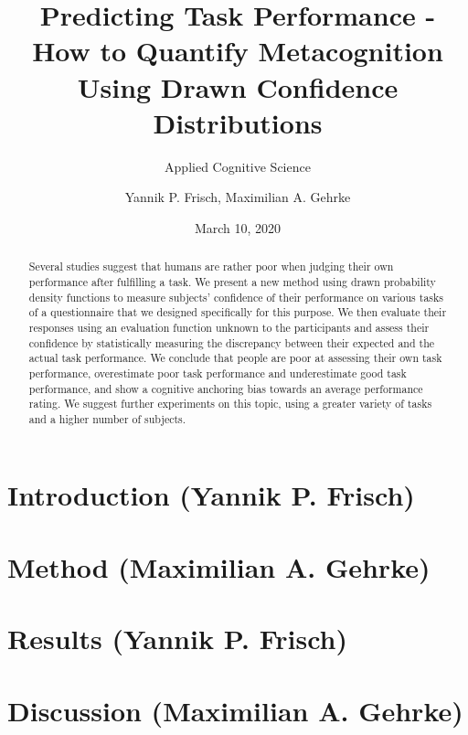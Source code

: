 \documentclass[
pdfa=false,  %
color=9c,
logo=body,
class=article,
marginpar=false,
logofile=../logos/tuda_logo.pdf
]{tudapub}
\author{Yannik P. Frisch, Maximilian A. Gehrke}
\title{Predicting Task Performance - How to Quantify Metacognition Using Drawn Confidence Distributions}
\date{March 10, 2020}
\subtitle{Applied Cognitive Science}
\begin{document}
\maketitle

\begin{abstract}
	Several studies suggest that humans are rather poor when judging their own performance after fulfilling a task. We present a new method using drawn probability density functions to measure subjects' confidence of their performance on various tasks of a questionnaire that we designed specifically for this purpose. We then evaluate their responses using an evaluation function unknown to the participants and assess their confidence by statistically measuring the discrepancy between their expected and the actual task performance. We conclude that people are poor at assessing their own task performance, overestimate poor task performance and underestimate good task performance, and show a cognitive anchoring bias towards an average performance rating. We suggest further experiments on this topic, using a greater variety of tasks and a higher number of subjects.
	
\end{abstract}

\section{Introduction (Yannik P. Frisch)}
	\label{sec:introduction}
	

\newpage
\section{Method (Maximilian A. Gehrke)}
	\label{sec:method}
	

\newpage
\section{Results (Yannik P. Frisch)}
	\label{sec:results}
	

\newpage
\section{Discussion (Maximilian A. Gehrke)}
	\label{sec:discussion}
	


\newpage
{}

\end{document}
